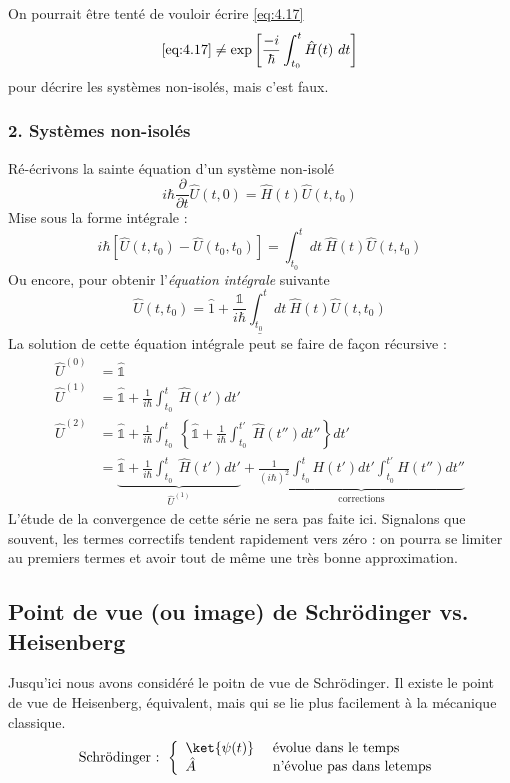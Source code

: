 		On pourrait être tenté de vouloir écrire \autoref{eq:4.17} 
		\begin{equation}
		\autoref{eq:4.17} \neq \exp\left[\dfrac{-i}{\hbar}\int_{t_0}^t \hat{H}(t)\ dt\right]
		\end{equation}
		pour décrire les systèmes non-isolés, mais c'est faux.
		
		\subsubsection{2. Systèmes non-isolés}
		Ré-écrivons la sainte équation d'un système non-isolé
		\begin{equation}
		i\hbar\dfrac{\partial}{\partial t}\hat{U}(t,0) = \hat{H}(t)\hat{U}(t,t_0)
		\end{equation}
		Mise sous la forme intégrale :
		\begin{equation}
		i\hbar\left[\hat{U}(t,t_0) - \hat{U}(t_0,t_0)\right] = \int_{t_0}^t dt\ \hat{H}(t)\hat{U}(t,t_0)
		\end{equation}
		Ou encore, pour obtenir l'\textit{équation intégrale} suivante
		\begin{equation}
		\underline{	\hat{U}(t,t_0) = \hat{1} + \frac{\mathbb{1}}{i\hbar}\int_{t_0}^t dt\ \hat{H}(t)\hat{U}(t,t_0)}
		\end{equation}
		La solution de cette équation intégrale peut se faire de façon récursive :
		\begin{equation}
		\begin{array}{ll}
		\hat{U}^{(0)} &= \hat{\mathbb{1}}\\
		\hat{U}^{(1)} &= \hat{\mathbb{1}} + \frac{1}{i\hbar}\int_{t_0}^t\ \hat{H}(t') dt'\\
		\hat{U}^{(2)} &= \hat{\mathbb{1}} + \frac{1}{i\hbar}\int_{t_0}^t\ \left\{ 
		\hat{\mathbb{1}} + \frac{1}{i\hbar}\int_{t_0}^{t'}\ \hat{H}(t'') dt''	\right\} dt'		\\
		&= \underbrace{\hat{\mathbb{1}} + \frac{1}{i\hbar}\int_{t_0}^t\ \hat{H}(t') dt'}_{\hat{U}^{(1)}} + 		
		\underbrace{\frac{1}{(i\hbar)^2}\int_{t_0}^t H(t')dt'\int_{t_0}^{t'} H(t'')dt''}_{\text{corrections}}
		\end{array}
		\end{equation}
		L'étude de la convergence de cette série ne sera pas faite ici. Signalons que souvent, les 
		termes correctifs tendent rapidement vers zéro : on pourra se limiter au premiers termes et 
		avoir tout de même une très bonne approximation.

	\subsection{Point de vue (ou image) de Schrödinger vs. Heisenberg}
	Jusqu'ici nous avons considéré le poitn de vue de Schrödinger. Il existe le point de vue de 
	Heisenberg, équivalent, mais qui se lie plus facilement à la mécanique classique.
	\begin{equation}
	\text{Schrödinger : }\left\{\begin{array}{ll}
	\ket{\psi(t)} & \text{ évolue dans le temps}\\
	\hat{A} & \text{ n'évolue pas dans letemps}	
	\end{array}\right.
	\end{equation}
	
